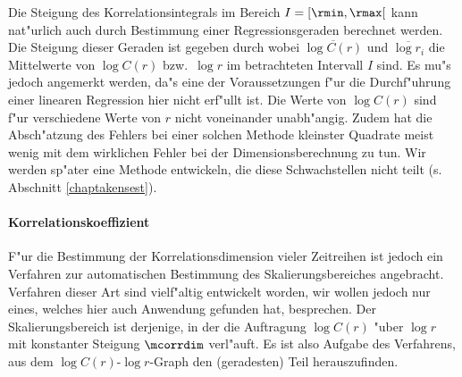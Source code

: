 Die Steigung des Korrelationsintegrals im Bereich $I=[\rmin,\rmax[$ kann nat"urlich auch
durch Bestimmung einer Regressionsgeraden berechnet werden. Die Steigung dieser Geraden
ist gegeben durch
wobei $\overline{\log C(r)}$ und $\overline{\log r_i}$ die Mittelwerte von $\log C(r)$
bzw.\ $\log r$ im betrachteten Intervall $I$ sind. Es mu"s jedoch angemerkt werden, da"s
eine der Voraussetzungen f"ur die Durchf"uhrung einer linearen Regression hier nicht
erf"ullt ist. Die Werte von $\log C(r)$ sind f"ur verschiedene Werte von $r$ nicht
voneinander unabh"angig. Zudem hat die Absch"atzung des Fehlers bei einer solchen Methode
kleinster Quadrate meist wenig mit dem wirklichen Fehler bei der Dimensionsberechnung zu
tun. Wir werden sp"ater eine Methode entwickeln, die diese Schwachstellen nicht teilt (s.
Abschnitt \ref{chaptakensest}).

\paragraph{Korrelationskoeffizient}
F"ur die Bestimmung der Korrelationsdimension vieler Zeitreihen ist jedoch ein Verfahren
zur automatischen Bestimmung des Skalierungsbereiches angebracht. Verfahren dieser Art
sind vielf"altig entwickelt worden, wir wollen jedoch nur eines, welches hier auch
Anwendung gefunden hat, besprechen. Der Skalierungsbereich ist derjenige, in der die
Auftragung $\log C(r)$ "uber $\log r$ mit konstanter Steigung $\mcorrdim$
verl"auft. Es ist also Aufgabe des Verfahrens, aus dem $\log C(r)$-$\log r$-Graph den
\naja(geradesten) Teil herauszufinden. 

